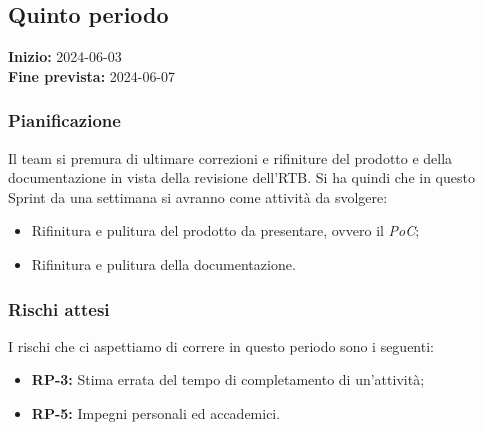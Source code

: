 \documentclass[8pt]{article}
\begin{document}
\subsection{Quinto periodo} \label{sec:_rtb}
\textbf{Inizio:} 2024-06-03\\
\textbf{Fine prevista:} 2024-06-07
\subsubsection{Pianificazione}
Il team si premura di ultimare correzioni e rifiniture del prodotto e della documentazione in vista della revisione dell'RTB. Si ha quindi che in questo Sprint da una settimana si avranno come attività da svolgere:
\begin{itemize}
    \setlength{\itemsep}{0em}
        \item Rifinitura e pulitura del prodotto da presentare, ovvero il \textit{PoC};
        \item Rifinitura e pulitura della documentazione.
    \end{itemize}

\subsubsection{Rischi attesi}
I rischi che ci aspettiamo di correre in questo periodo sono i seguenti: 
\begin{itemize}
    \setlength{\itemsep}{0em}
        \item \textbf{RP-3:} Stima errata del tempo di completamento di un'attività;
        \item \textbf{RP-5:} Impegni personali ed accademici.
\end{itemize}
\newpage
\clearpage
\end{document}
